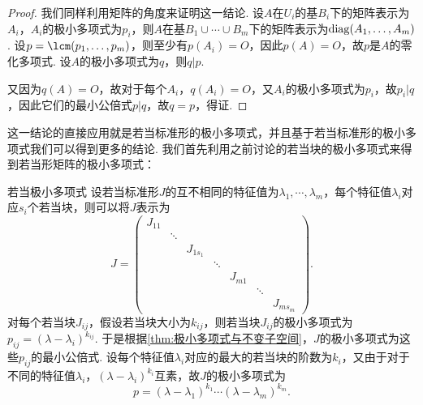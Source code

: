 \begin{proof}
    我们同样利用矩阵的角度来证明这一结论. 设$A$在$U_i$的基$B_i$下的矩阵表示为$A_i$，$A_i$的极小多项式为$p_i$，则$A$在基$B_1\cup\cdots\cup B_m$下的矩阵表示为$\operatorname{diag}(A_1,\ldots,A_m)$. 设$p=\lcm(p_1,\ldots,p_m)$，则至少有$p(A_i)=O$，因此$p(A)=O$，故$p$是$A$的零化多项式. 设$A$的极小多项式为$q$，则$q\vert p$.

    又因为$q(A)=O$，故对于每个$A_i$，$q(A_i)=O$，又$A_i$的极小多项式为$p_i$，故$p_i\vert q$，因此它们的最小公倍式$p\vert q$，故$q=p$，得证.
\end{proof}

这一结论的直接应用就是若当标准形的极小多项式，并且基于若当标准形的极小多项式我们可以得到更多的结论. 我们首先利用之前讨论的若当块的极小多项式来得到若当形矩阵的极小多项式：
\begin{example}{}{若当极小多项式}
    设若当标准形$J$的互不相同的特征值为$\lambda_1,\cdots,\lambda_m$，每个特征值$\lambda_i$对应$s_i$个若当块，则可以将$J$表示为
    \[J=\begin{pmatrix}
            J_{11} &        &          &        &        &        &          \\
                   & \ddots &          &        &        &        &          \\
                   &        & J_{1s_1} &        &        &        &          \\
                   &        &          & \ddots &        &        &          \\
                   &        &          &        & J_{m1} &        &          \\
                   &        &          &        &        & \ddots &          \\
                   &        &          &        &        &        & J_{ms_m}
        \end{pmatrix}.\]
    对每个若当块$J_{ij}$，假设若当块大小为$k_{ij}$，则若当块$J_{ij}$的极小多项式为$p_{ij}=(\lambda-\lambda_i)^{k_{ij}}$. 于是根据\autoref{thm:极小多项式与不变子空间}，$J$的极小多项式为这些$p_{ij}$的最小公倍式. 设每个特征值$\lambda_i$对应的最大的若当块的阶数为$k_i$，又由于对于不同的特征值$\lambda_i$，$(\lambda-\lambda_i)^{k_i}$互素，故$J$的极小多项式为
    \[p=(\lambda-\lambda_1)^{k_1}\cdots(\lambda-\lambda_m)^{k_m}.\]
\end{example}

